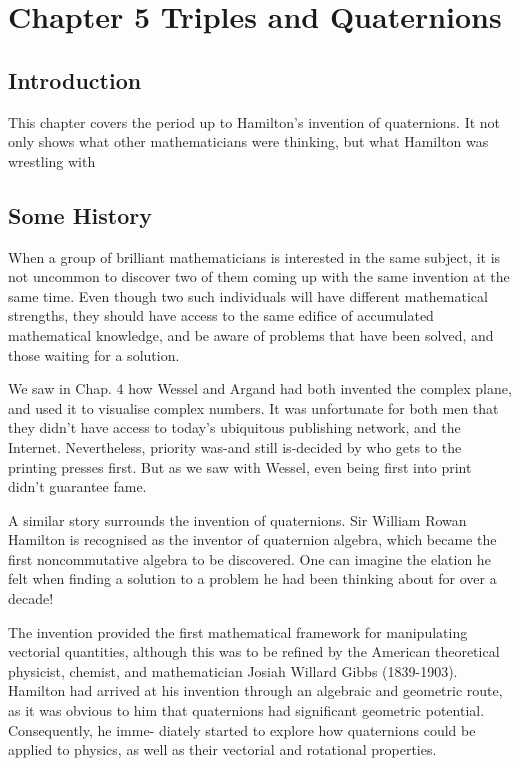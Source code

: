 \documentclass[10pt]{article}
\begin{document}
\section{Chapter 5
Triples and Quaternions}
\subsection{Introduction}
This chapter covers the period up to Hamilton's invention of quaternions. It not only shows what other mathematicians were thinking, but what Hamilton was wrestling with

\subsection{Some History}
When a group of brilliant mathematicians is interested in the same subject, it is not uncommon to discover two of them coming up with the same invention at the same time. Even though two such individuals will have different mathematical strengths, they should have access to the same edifice of accumulated mathematical knowledge, and be aware of problems that have been solved, and those waiting for a solution.

We saw in Chap. 4 how Wessel and Argand had both invented the complex plane, and used it to visualise complex numbers. It was unfortunate for both men that they didn't have access to today's ubiquitous publishing network, and the Internet. Nevertheless, priority was-and still is-decided by who gets to the printing presses first. But as we saw with Wessel, even being first into print didn't guarantee fame.

A similar story surrounds the invention of quaternions. Sir William Rowan Hamilton is recognised as the inventor of quaternion algebra, which became the first noncommutative algebra to be discovered. One can imagine the elation he felt when finding a solution to a problem he had been thinking about for over a decade!

The invention provided the first mathematical framework for manipulating vectorial quantities, although this was to be refined by the American theoretical physicist, chemist, and mathematician Josiah Willard Gibbs (1839-1903). Hamilton had arrived at his invention through an algebraic and geometric route, as it was obvious to him that quaternions had significant geometric potential. Consequently, he imme- diately started to explore how quaternions could be applied to physics, as well as their vectorial and rotational properties.
\end{document}
